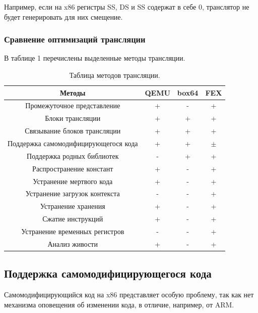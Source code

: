 Например, если на x86 регистры SS, DS и SS содержат в себе 0, транслятор не будет генерировать для них смещение.

\subsubsection{Сравнение оптимизаций трансляции}

В таблице 1 %
перечислены выделенные методы трансляции. 

\begin{table}[!htb]
	\label{table:methods}
	\begin{center}
		\caption{Таблица методов трансляции.}
			\begin{tabular}{|c|c|c|c|}
				\hline
				\bfseries Методы & \bfseries QEMU & \bfseries box64 & \bfseries FEX  \\
				\hline
				Промежуточное представление & + & - & + \\ \hline
				Блоки трансляции & + & + & + \\ \hline
				Связывание блоков трансляции & + & + & + \\ \hline
				Поддержка самомодифицирующегося кода & + & + & $\pm$ \\ \hline
				Поддержка родных библиотек & - & + & + \\ \hline
				Распространение констант & + & - & + \\ \hline
				Устранение мертвого кода & + & - & + \\ \hline
				Устранение загрузок контекста & - & - & + \\ \hline
				Устранение хранения & + & - & + \\ \hline
				Сжатие инструкций & + & - & + \\ \hline
				Устранение временных регистров & - & - & + \\ \hline
				Анализ живости & + & - & + \\ \hline
		\end{tabular}
	\end{center}
\end{table}

\newpage

\subsection{Поддержка самомодифицирующегося кода}

Самомодифицирующийся код на x86 представляет особую проблему, так как нет механизма оповещения об изменении кода, в отличие, например, от ARM.

